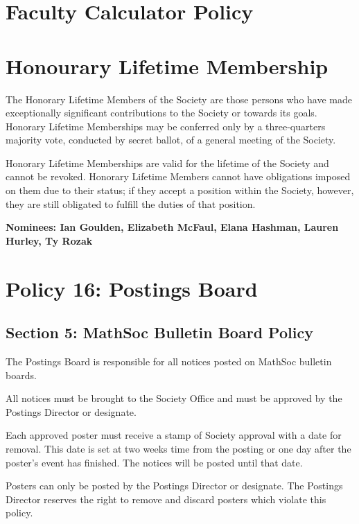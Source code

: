 \documentclass[12pt, letterpaper]{article}
\begin{document}
\newpage
{}


\newpage
{}
\section*{Faculty Calculator Policy}


\newpage
{}
\section*{Honourary Lifetime Membership}
The Honorary Lifetime Members of the Society are those persons who have made exceptionally significant contributions to the Society or towards its goals. Honorary Lifetime Memberships may be conferred only by a three-quarters majority vote, conducted by secret ballot, of a general meeting of the Society.

Honorary Lifetime Memberships are valid for the lifetime of the Society and cannot be revoked. Honorary Lifetime Members cannot have obligations imposed on them due to their status; if they accept a position within the Society, however, they are still obligated to fulfill the duties of that position.

\textbf{Nominees: Ian Goulden, Elizabeth McFaul, Elana Hashman, Lauren Hurley, Ty Rozak}

\newpage
{}
\section*{Policy 16: Postings Board}
\subsection*{Section 5: MathSoc Bulletin Board Policy}
The Postings Board is responsible for all notices posted on MathSoc bulletin boards.

All notices must be brought to the Society Office and must be approved by the Postings Director or designate.

Each approved poster must receive a stamp of Society approval with a date for removal. This date is set at two weeks time from the posting or one day after the poster's event has finished. The notices will be posted until that date.

Posters can only be posted by the Postings Director or designate. The Postings Director reserves the right to remove and discard posters which violate this policy.
\end{document}
